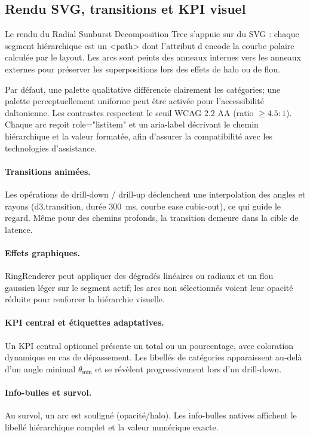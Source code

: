 \subsection{Rendu SVG, transitions et KPI visuel}
\label{subsec:4B-rendering}

\setlength{\parindent}{0pt}

Le rendu du Radial Sunburst Decomposition Tree  s’appuie sur du SVG : 
chaque segment hiérarchique est un <path> dont l’attribut d encode la courbe polaire calculée par le layout. 
Les arcs sont peints des anneaux internes vers les anneaux externes pour préserver les superpositions lors des effets de halo ou de flou.

Par défaut, une palette qualitative différencie clairement les catégories; 
une palette perceptuellement uniforme peut être activée pour l’accessibilité daltonienne. 
Les contrastes respectent le seuil WCAG 2.2 AA (ratio \(\geq 4.5{:}1\)). 
Chaque arc reçoit role="listitem" et un aria-label décrivant le chemin hiérarchique et la valeur formatée, 
afin d’assurer la compatibilité avec les technologies d’assistance.

\paragraph{Transitions animées.}
Les opérations de drill-down / drill-up déclenchent une interpolation des angles et rayons (d3.transition, 
durée \SI{300}{\milli\second}, courbe ease cubic-out), ce qui guide le regard. 
Même pour des chemins profonds, la transition demeure dans la cible de latence.

\paragraph{Effets graphiques.}
RingRenderer peut appliquer des dégradés linéaires ou radiaux et un flou gaussien léger sur le segment actif; 
les arcs non sélectionnés voient leur opacité réduite pour renforcer la hiérarchie visuelle.

\paragraph{KPI central et étiquettes adaptatives.}
Un KPI central optionnel présente un total ou un pourcentage, avec coloration dynamique en cas de dépassement. 
Les libellés de catégories apparaissent au-delà d’un angle minimal \(\theta_{\min}\) et se révèlent progressivement lors d’un drill-down.

\paragraph{Info-bulles et survol.}
Au survol, un arc est souligné (opacité/halo). 
Les info-bulles natives affichent le libellé hiérarchique complet et la valeur numérique exacte.
